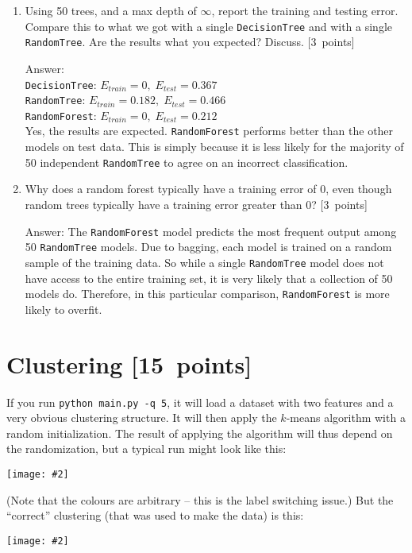 \documentclass{article}
\newcommand{\blu}[1]{{\textcolor{blu}{#1}}}
\newenvironment{answer}{\par\begingroup\color{gre}Answer: }{\endgroup}
\let\ask\blu
\newcommand\pts[1]{\textcolor{pointscolour}{[#1~points]}}
\newcommand{\centerfig}[2]{\begin{center}\texttt{[image: \#2]}\end{center}}
\begin{document}
\begin{enumerate}
        \item Using 50 trees, and a max depth of $\infty$, \ask{report the training and testing error}. Compare this to what we got with a single \texttt{DecisionTree} and with a single \texttt{RandomTree}. \ask{Are the results what you expected? Discuss.} \pts{3}
        \begin{answer}\\
            \texttt{DecisionTree}: $E_{train} = 0,\; E_{test} = 0.367$\\
            \texttt{RandomTree}: $E_{train} = 0.182,\; E_{test} = 0.466$\\
            \texttt{RandomForest}: $E_{train} = 0,\; E_{test} = 0.212$\\
            Yes, the results are expected. \texttt{RandomForest} performs better than the other models on test data. This is simply because it is less likely for the majority of 50 independent \texttt{RandomTree} to agree on an incorrect classification.
        \end{answer}

        \item \ask{Why does a random forest typically have a training error of 0, even though random trees typically have a training error greater than 0?} \pts{3}
        \begin{answer}
            The \texttt{RandomForest} model predicts the most frequent output among 50 \texttt{RandomTree} models. Due to bagging, each model is trained on a random sample of the training data. So while a single \texttt{RandomTree} model does not have access to the entire training set, it is very likely that a collection of 50 models do. Therefore, in this particular comparison, \texttt{RandomForest} is more likely to overfit.
        \end{answer}
    \end{enumerate}


    \clearpage
    \section{Clustering \pts{15}}

    If you run \verb|python main.py -q 5|, it will load a dataset with two features
    and a very obvious clustering structure. It will then apply the $k$-means algorithm
    with a random initialization. The result of applying the
    algorithm will thus depend on the randomization, but a typical run might look like this:
    \centerfig{.5}{figs/kmeans_basic.png}
    (Note that the colours are arbitrary -- this is the label switching issue.)
    But the ``correct'' clustering (that was used to make the data) is this:
    \centerfig{.5}{figs/kmeans_good.png}
\end{document}
